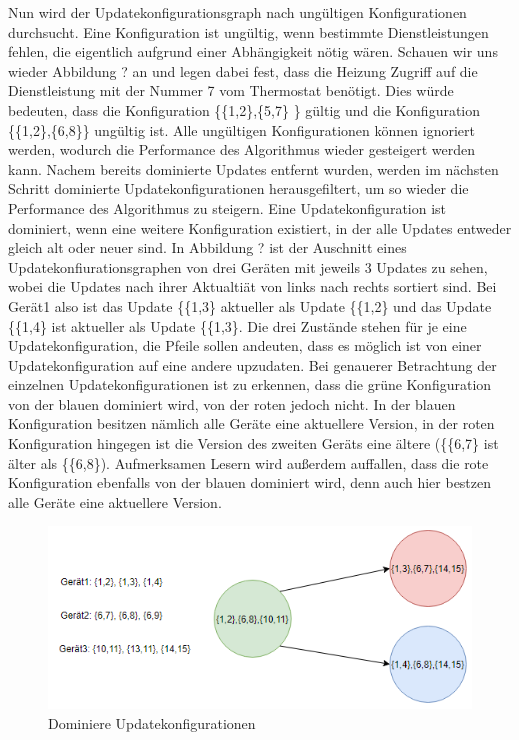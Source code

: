 Nun wird der Updatekonfigurationsgraph nach ungültigen Konfigurationen durchsucht. Eine Konfiguration ist ungültig, wenn bestimmte
Dienstleistungen fehlen, die eigentlich aufgrund einer Abhängigkeit nötig wären. Schauen wir uns wieder Abbildung ? an und legen dabei
fest, dass die Heizung Zugriff auf die Dienstleistung mit der Nummer 7  vom Thermostat benötigt. Dies würde bedeuten, dass die Konfiguration
\{\{1,2\},\{5,7\} \} gültig und die Konfiguration \{\{1,2\},\{6,8\}\} ungültig ist. Alle ungültigen Konfigurationen können ignoriert werden, wodurch
die Performance des Algorithmus wieder gesteigert werden kann.
Nachem bereits dominierte Updates entfernt wurden, werden im nächsten Schritt dominierte Updatekonfigurationen herausgefiltert, um so wieder die
Performance des Algorithmus zu steigern. Eine Updatekonfiguration ist dominiert, wenn eine weitere Konfiguration existiert, in der alle Updates entweder
gleich alt oder neuer sind. In Abbildung ? ist der Auschnitt eines Updatekonfiurationsgraphen von drei Geräten mit jeweils 3 Updates zu sehen, wobei die Updates
nach ihrer Aktualtiät von links nach rechts sortiert sind. Bei Gerät1 also ist das Update \{\{1,3\} aktueller als Update \{\{1,2\} und das Update \{\{1,4\} ist aktueller
als Update \{\{1,3\}. Die drei Zustände stehen für je eine Updatekonfiguration, die Pfeile sollen andeuten, dass es möglich ist von einer Updatekonfiguration auf
eine andere upzudaten. Bei genauerer Betrachtung der einzelnen Updatekonfigurationen ist zu erkennen, dass die grüne Konfiguration von der blauen dominiert wird,
von der roten jedoch nicht. In der blauen Konfiguration besitzen nämlich alle Geräte eine aktuellere Version, in der roten Konfiguration hingegen ist die Version des
zweiten Geräts eine ältere (\{\{6,7\} ist älter als \{\{6,8\}). Aufmerksamen Lesern wird außerdem auffallen, dass die rote Konfiguration ebenfalls von der blauen dominiert
wird, denn auch hier bestzen alle Geräte eine aktuellere Version.
\begin{figure}[!h]
\begin{center}
\includegraphics{"Dominierte Konfig"}
\caption{Dominiere Updatekonfigurationen}
\label{fig:Prob1:MEA}
\end{center}
\end{figure}

